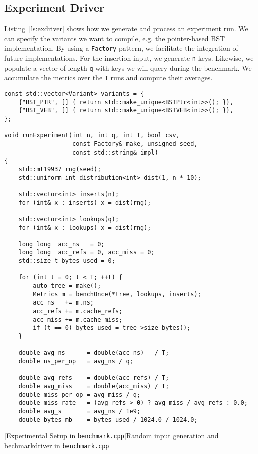 \documentclass{article}
\begin{document}
\subsection{Experiment Driver}
Listing~\ref{ls:exdriver} shows how we generate and process an experiment run. We can specify the variants we want to compile, e.g. the pointer-based BST implementation. By using a \texttt{Factory} pattern, we facilitate the integration of future implementations. For the insertion input, we generate \texttt{n} keys. Likewise, we populate a vector of length \texttt{q} with keys we will query during the benchmark. We accumulate the metrics over the \texttt{T} runs and compute their averages. 
\begin{lstlisting}
const std::vector<Variant> variants = {
    {"BST_PTR", [] { return std::make_unique<BSTPtr<int>>(); }},
    {"BST_VEB", [] { return std::make_unique<BSTVEB<int>>(); }},
};

void runExperiment(int n, int q, int T, bool csv,
                   const Factory& make, unsigned seed,
                   const std::string& impl)
{
    std::mt19937 rng(seed);
    std::uniform_int_distribution<int> dist(1, n * 10);

    std::vector<int> inserts(n);
    for (int& x : inserts) x = dist(rng);

    std::vector<int> lookups(q);
    for (int& x : lookups) x = dist(rng);

    long long  acc_ns   = 0;
    long long  acc_refs = 0, acc_miss = 0;
    std::size_t bytes_used = 0;

    for (int t = 0; t < T; ++t) {
        auto tree = make();
        Metrics m = benchOnce(*tree, lookups, inserts);
        acc_ns   += m.ns;
        acc_refs += m.cache_refs;
        acc_miss += m.cache_miss;
        if (t == 0) bytes_used = tree->size_bytes();  
    }

    double avg_ns      = double(acc_ns)   / T;
    double ns_per_op   = avg_ns / q;

    double avg_refs    = double(acc_refs) / T;
    double avg_miss    = double(acc_miss) / T;
    double miss_per_op = avg_miss / q;
    double miss_rate   = (avg_refs > 0) ? avg_miss / avg_refs : 0.0;  
    double avg_s       = avg_ns / 1e9;
    double bytes_mb    = bytes_used / 1024.0 / 1024.0;
\end{lstlisting}
[Experimental Setup in \texttt{benchmark.cpp}]{Random input generation and bechmarkdriver in \texttt{benchmark.cpp}}
\label{ls:exdriver}
\end{document}
